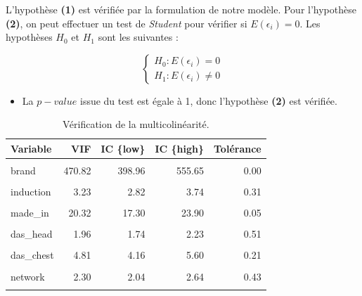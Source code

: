\documentclass[
  12pt,
]{report}
\providecommand{\tightlist}{%
  \setlength{\itemsep}{0pt}\setlength{\parskip}{0pt}}\usepackage{longtable,booktabs,array}
\begin{document}
L'hypothèse \textbf{(1)} est vérifiée par la formulation de notre
modèle. Pour l'hypothèse \textbf{(2)}, on peut effectuer un test de
\emph{Student} pour vérifier si \(E(\epsilon_i) = 0\). Les hypothèses
\(H_0\) et \(H_1\) sont les suivantes :

\[
\begin{cases}
H_0 : E(\epsilon_i) = 0\\
H_1 : E(\epsilon_i) \neq 0
\end{cases}
\]

\vspace{1em}

\begin{itemize}
\tightlist
\item
  La \(p-value\) issue du test est égale à 1, donc l'hypothèse
  \textbf{(2)} est vérifiée.
\end{itemize}

\begin{table}[!h]

\caption{\label{tab:collinearity}Vérification de la multicolinéarité.}
\centering
\begin{tabular}[t]{lrrrr}
\toprule
\textbf{Variable} & \textbf{VIF} & \textbf{IC \{low\}} & \textbf{IC \{high\}} & \textbf{Tolérance}\\
\midrule
\cellcolor{gray!6}{storage} & \cellcolor{gray!6}{1.99} & \cellcolor{gray!6}{1.77} & \cellcolor{gray!6}{2.27} & \cellcolor{gray!6}{0.50}\\
brand & 470.82 & 398.96 & 555.65 & 0.00\\
\cellcolor{gray!6}{ram} & \cellcolor{gray!6}{4.28} & \cellcolor{gray!6}{3.71} & \cellcolor{gray!6}{4.98} & \cellcolor{gray!6}{0.23}\\
induction & 3.23 & 2.82 & 3.74 & 0.31\\
\cellcolor{gray!6}{screen\_size} & \cellcolor{gray!6}{1.95} & \cellcolor{gray!6}{1.73} & \cellcolor{gray!6}{2.22} & \cellcolor{gray!6}{0.51}\\
\addlinespace
made\_in & 20.32 & 17.30 & 23.90 & 0.05\\
\cellcolor{gray!6}{upgrade\_storage} & \cellcolor{gray!6}{3.72} & \cellcolor{gray!6}{3.23} & \cellcolor{gray!6}{4.31} & \cellcolor{gray!6}{0.27}\\
das\_head & 1.96 & 1.74 & 2.23 & 0.51\\
\cellcolor{gray!6}{das\_limbs} & \cellcolor{gray!6}{2.53} & \cellcolor{gray!6}{2.23} & \cellcolor{gray!6}{2.91} & \cellcolor{gray!6}{0.40}\\
das\_chest & 4.81 & 4.16 & 5.60 & 0.21\\
\addlinespace
\cellcolor{gray!6}{fast\_charging} & \cellcolor{gray!6}{1.27} & \cellcolor{gray!6}{1.17} & \cellcolor{gray!6}{1.43} & \cellcolor{gray!6}{0.79}\\
network & 2.30 & 2.04 & 2.64 & 0.43\\
\cellcolor{gray!6}{ppi} & \cellcolor{gray!6}{2.35} & \cellcolor{gray!6}{2.08} & \cellcolor{gray!6}{2.70} & \cellcolor{gray!6}{0.42}\\
\bottomrule
\end{tabular}
\end{table}
\end{document}
